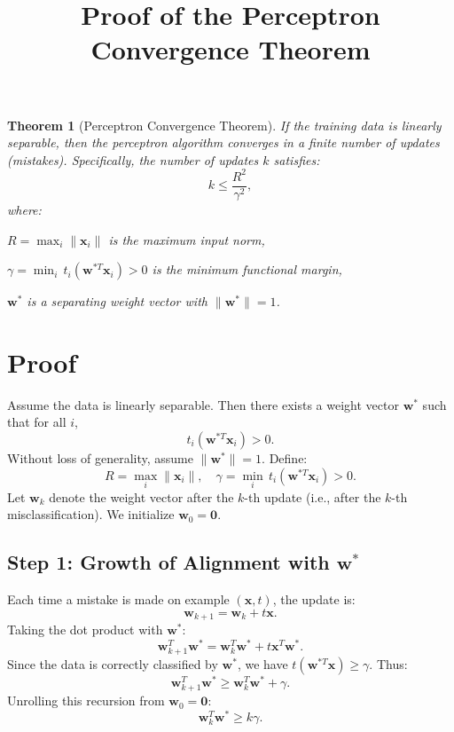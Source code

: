 \documentclass{article}
\title{Proof of the Perceptron Convergence Theorem}
\author{}
\date{}
\newtheorem{theorem}{Theorem}
\begin{document}
\maketitle

\begin{theorem}[Perceptron Convergence Theorem]
If the training data is linearly separable, then the perceptron algorithm converges in a finite number of updates (mistakes). Specifically, the number of updates $k$ satisfies:
\[
k \leq \frac{R^2}{\gamma^2},
\]
where:
\item $R = \max_i \|\mathbf{x}_i\|$ is the maximum input norm,
    \item $\gamma = \min_i \, t_i (\mathbf{w}^{*T} \mathbf{x}_i) > 0$ is the minimum functional margin,
    \item $\mathbf{w}^*$ is a separating weight vector with $\|\mathbf{w}^*\| = 1$.
\end{theorem}

\section*{Proof}

Assume the data is linearly separable. Then there exists a weight vector $\mathbf{w}^*$ such that for all $i$,
\[
t_i (\mathbf{w}^{*T} \mathbf{x}_i) > 0.
\]
Without loss of generality, assume $\|\mathbf{w}^*\| = 1$. Define:
\[
R = \max_i \|\mathbf{x}_i\|, \quad \gamma = \min_i \, t_i (\mathbf{w}^{*T} \mathbf{x}_i) > 0.
\]
Let $\mathbf{w}_k$ denote the weight vector after the $k$-th update (i.e., after the $k$-th misclassification). We initialize $\mathbf{w}_0 = \mathbf{0}$.

\subsection*{Step 1: Growth of Alignment with $\mathbf{w}^*$}

Each time a mistake is made on example $(\mathbf{x}, t)$, the update is:
\[
\mathbf{w}_{k+1} = \mathbf{w}_k + t \mathbf{x}.
\]
Taking the dot product with $\mathbf{w}^*$:
\[
\mathbf{w}_{k+1}^T \mathbf{w}^* = \mathbf{w}_k^T \mathbf{w}^* + t \mathbf{x}^T \mathbf{w}^*.
\]
Since the data is correctly classified by $\mathbf{w}^*$, we have $t (\mathbf{w}^{*T} \mathbf{x}) \geq \gamma$. Thus:
\[
\mathbf{w}_{k+1}^T \mathbf{w}^* \geq \mathbf{w}_k^T \mathbf{w}^* + \gamma.
\]
Unrolling this recursion from $\mathbf{w}_0 = \mathbf{0}$:
\[
\mathbf{w}_k^T \mathbf{w}^* \geq k \gamma.
\tag{1}
\]
\end{document}
